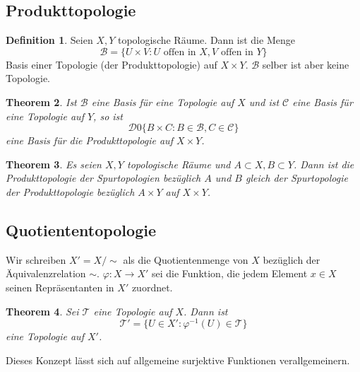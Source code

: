 \documentclass[a4paper, 12pt]{article}
\theoremstyle{plain}
\newtheorem{theorem}{Theorem}[section] %
\theoremstyle{definition}
\newtheorem{definition}[theorem]{Definition} %
\theoremstyle{lemma}
\theoremstyle{remark}
\theoremstyle{corollary}
\theoremstyle{example}
\begin{document}
	\subsection{Produkttopologie}
	\begin{definition}
		Seien $X,Y$ topologische Räume. Dann ist die Menge \[\mathcal{B} = \{U\times V: U \text{ offen in } X, V \text{ offen in } Y\}\] Basis einer Topologie (der Produkttopologie) auf $X\times Y$. $\mathcal{B}$ selber ist aber keine Topologie.
	\end{definition}
	\begin{theorem}
		Ist $\mathcal{B}$ eine Basis für eine Topologie auf $X$ und ist $\mathcal{C}$ eine Basis für eine Topologie auf $Y$, so ist \[\mathcal{D} 0 \{B\times C: B \in \mathcal{B}, C \in \mathcal{C}\}\] eine Basis für die Produkttopologie auf $X\times Y$.
	\end{theorem}
	\begin{theorem}
		Es seien $X,Y$ topologische Räume und $A\subset X, B\subset Y$. Dann ist die Produkttopologie der Spurtopologien bezüglich $A$ und $B$ gleich der Spurtopologie der Produkttopologie bezüglich $A\times Y$ auf $X\times Y$.
	\end{theorem}
	\subsection{Quotiententopologie}
	Wir schreiben $X' = X/\sim$ als die Quotientenmenge von $X$ bezüglich der Äquivalenzrelation $\sim$. $\varphi: X \to X'$ sei die Funktion, die jedem Element $x \in X$ seinen Repräsentanten in $X'$ zuordnet.
	\begin{theorem}
		Sei $\mathcal{T}$ eine Topologie auf $X$. Dann ist \[\mathcal{T}' = \{U \in X': \varphi^{-1}(U) \in \mathcal{T}\}\] eine Topologie auf $X'$.
	\end{theorem}
	Dieses Konzept lässt sich auf allgemeine surjektive Funktionen verallgemeinern.
\end{document}
